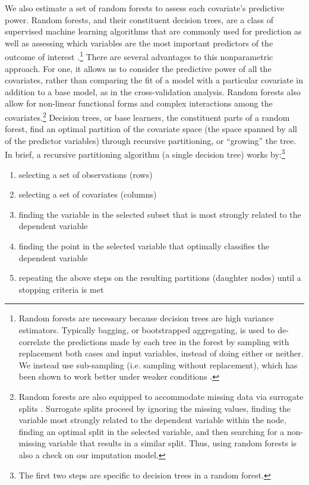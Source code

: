 \documentclass[12pt]{article}
\begin{document}
We also estimate a set of random forests to assess each covariate's predictive power. Random forests, and their constituent decision trees, are a class of supervised machine learning algorithms that are commonly used for prediction as well as assessing which variables are the most important predictors of the outcome of interest  \citep[pp. 543-551]{murphy2012machine}.\footnote{Random forests are necessary because decision trees are high variance estimators. Typically bagging, or bootstrapped aggregating, is used to de-correlate the predictions made by each tree in the forest by sampling with replacement both cases and input variables, instead of doing either or neither. We instead use sub-sampling (i.e. sampling without replacement), which has been shown to work better under weaker conditions \citep{politis-sub}.} There are several advantages to this nonparametric approach. For one, it allows us to consider the predictive power of all the covariates, rather than comparing the fit of a model with a particular covariate in addition to a base model, as in the cross-validation analysis. Random forests also allow for non-linear functional forms and complex interactions among the covariates.\footnote{Random forests are also equipped to accommodate missing data via surrogate splits \citep{hothorn2006unbiased}. Surrogate splits proceed by ignoring the missing values, finding the variable most strongly related to the dependent variable within the node, finding an optimal split in the selected variable, and then searching for a non-missing variable that results in a similar split. Thus, using random forests is also a check on our imputation model.} Decision trees, or base learners, the constituent parts of a random forest, find an optimal partition of the covariate space (the space spanned by all of the predictor variables) through recursive partitioning, or ``growing'' the tree. In brief, a recursive partitioning algorithm (a single decision tree) works by:\footnote{The first two steps are specific to decision trees in a random forest.}
\begin{enumerate}
\item selecting a set of observations (rows)
\item selecting a set of covariates (columns)
\item finding the variable in the selected subset that is most strongly related to the dependent variable
\item finding the point in the selected variable that optimally classifies the dependent variable
\item repeating the above steps on the resulting partitions (daughter nodes) until a stopping criteria is met
\end{enumerate}
\end{document}
